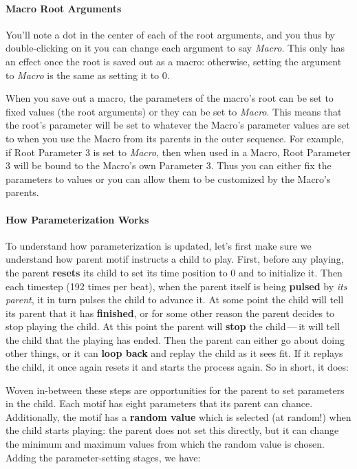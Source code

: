 \documentclass[twoside,10pt]{article}
\begin{document}
\paragraph{Macro Root Arguments} You'll note a dot in the center of each of the root arguments, and you thus by double-clicking on it you can change each argument to say {\it Macro}.  This only has an effect once the root is saved out as a macro: otherwise, setting the argument to {\it Macro} is the same as setting it to 0.

When you save out a macro, the parameters of the macro's root can be set to fixed values (the root arguments) or they can be set to {\it Macro}.  This means that the root's parameter will be set to whatever the Macro's parameter values are set to when you use the Macro from its parents in the outer sequence.  For example, if Root Parameter 3 is set to {\it Macro}, then when used in a Macro, Root Parameter 3 will be bound to the Macro's own Parameter 3.  Thus you can either fix the parameters to values or you can allow them to be customized by the Macro's parents.

\paragraph{How Parameterization Works}
To understand how parameterization is updated, let's first make sure we understand how  parent motif instructs a child to play.  First, before any playing, the parent {\bf resets} its child to set its time position to 0 and to initialize it.  Then each timestep (192 times per beat), when the parent itself is being {\bf pulsed} by {\it its parent}, it in turn pulses the child to advance it.  At some point the child will tell its parent that it has {\bf finished}, or for some other reason the parent decides to stop playing the child.  At this point the parent will {\bf stop} the child\,---\,it will tell the child that the playing has ended.  Then the parent can either go about doing other things, or it can {\bf loop back} and replay the child as it sees fit.  If it replays the child, it once again resets it and starts the process again.  So in short, it does:

Woven in-between these steps are opportunities for the parent to set parameters in the child.    Each motif has eight parameters that its parent can chance.  Additionally, the motif has a {\bf random value} which is selected (at random!) when the child starts playing: the parent does not set this directly, but it can change the minimum and maximum values from which the random value is chosen.  Adding the parameter-setting stages, we have: 
\end{document}
